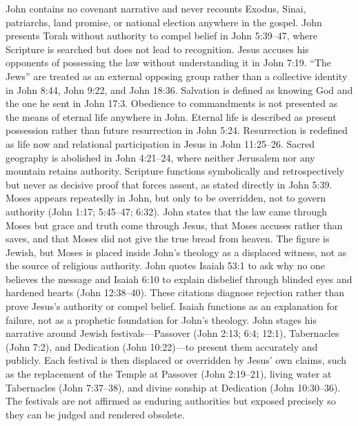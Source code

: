John contains no covenant narrative and never recounts Exodus, Sinai, patriarchs, land promise, or national election anywhere in the gospel.
John presents Torah without authority to compel belief in John 5:39--47, where Scripture is searched but does not lead to recognition.
Jesus accuses his opponents of possessing the law without understanding it in John 7:19.
``The Jews'' are treated as an external opposing group rather than a collective identity in John 8:44, John 9:22, and John 18:36.
Salvation is defined as knowing God and the one he sent in John 17:3.
Obedience to commandments is not presented as the means of eternal life anywhere in John.
Eternal life is described as present possession rather than future resurrection in John 5:24.
Resurrection is redefined as life now and relational participation in Jesus in John 11:25--26.
Sacred geography is abolished in John 4:21--24, where neither Jerusalem nor any mountain retains authority.
Scripture functions symbolically and retrospectively but never as decisive proof that forces assent, as stated directly in John 5:39.
Moses appears repeatedly in John, but only to be overridden, not to govern authority (John 1:17; 5:45--47; 6:32).
John states that the law came through Moses but grace and truth come through Jesus, that Moses accuses rather than saves, and that Moses did not give the true bread from heaven.
The figure is Jewish, but Moses is placed inside John's theology as a displaced witness, not as the source of religious authority.
John quotes Isaiah 53:1 to ask why no one believes the message and Isaiah 6:10 to explain disbelief through blinded eyes and hardened hearts (John 12:38--40).
These citations diagnose rejection rather than prove Jesus's authority or compel belief.
Isaiah functions as an explanation for failure, not as a prophetic foundation for John's theology.
John stages his narrative around Jewish festivals---Passover (John 2:13; 6:4; 12:1), Tabernacles (John 7:2), and Dedication (John 10:22)---to present them accurately and publicly.
Each festival is then displaced or overridden by Jesus' own claims, such as the replacement of the Temple at Passover (John 2:19--21), living water at Tabernacles (John 7:37--38), and divine sonship at Dedication (John 10:30--36).
The festivals are not affirmed as enduring authorities but exposed precisely so they can be judged and rendered obsolete.

